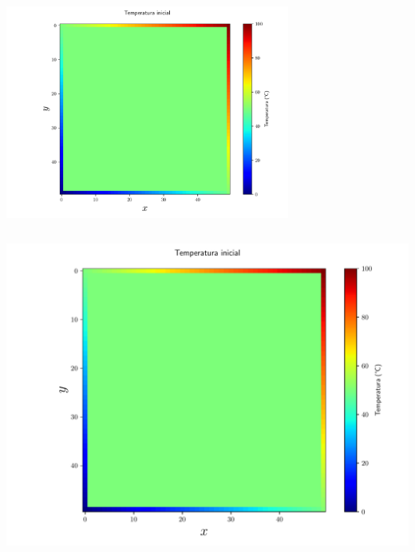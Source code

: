 \documentclass[9pt, aspectratio=169]{beamer}
\begin{document}
\begin{frame}
\begin{columns}
\begin{center}
    \includegraphics[width=0.7\textwidth]{code/temp-inicial.pdf}
\end{center}
\end{columns}
\end{frame}

\begin{frame}
\begin{columns}
\begin{center}
    \includegraphics[width=1.0\textwidth]{code/temp-inicial.pdf}
\end{center}
\end{columns}
\end{frame}
\end{document}
